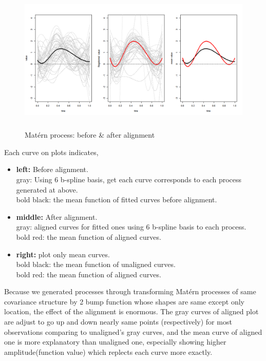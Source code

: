 \documentclass{article}
\begin{document}
\begin{figure}[hh]
    \centering
    \includegraphics[height=7cm]{matern_align_compare.png}
    \caption{Mat\'{e}rn process: before \& after alignment}
\end{figure}
Each curve on plots indicates,
\begin{itemize}
    \item{\textbf{left:} Before alignment. \\
    gray: Using 6 b-spline basis, get each curve corresponds to each process generated at above.\\
    bold black: the mean function of fitted curves before alignment.}
    \item{\textbf{middle:} After alignment. \\
    gray: aligned curves for fitted ones using 6 b-spline basis to each process.\\
    bold red: the mean function of aligned curves.}
    \item{\textbf{right:} plot only mean curves.\\
    bold black: the mean function of unaligned curves.\\
    bold red: the mean function of aligned curves.}
\end{itemize}


Because we generated processes through transforming Mat\'{e}rn processes of same covariance structure 
by 2 bump function whose shapes are same except only location, the effect of the alignment is enormous.
The gray curves of aligned plot are adjust to go up and down nearly same points (respectively) for most observations
comparing to unaligned's gray curves, and the mean curve of aligned one is more explanatory than unaligned one, 
especially showing higher amplitude(function value) which replects each curve more exactly.


\newpage
\end{document}
